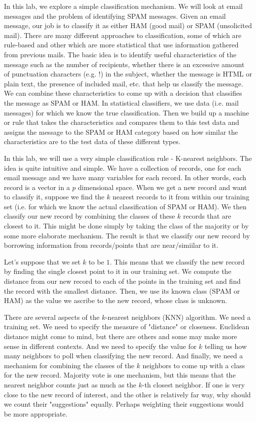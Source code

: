 
In this lab, we explore a simple classification mechanism.  We will
look at email messages and the problem of identifying SPAM messages.
Given an email message, our job is to classify it as either HAM (good
mail) or SPAM (unsolicited mail).  There are many different approaches
to classification, some of which are rule-based and other which are
more statistical that use information gathered from previous mails.
The basic idea is to identify useful characteristics of the message
such as the number of recipients, whether there is an excessive amount
of punctuation characters (e.g. !) in the subject, whether the message
is HTML or plain text, the presence of included mail, etc. that help
us classify the message.  We can combine these characteristics to come
up with a decision that classifies the message as SPAM or HAM.  In
statistical classifiers, we use data (i.e. mail messages) for which we
know the true classification.  Then we build up a machine or rule that
takes the characteristics and compares them to this test data and
assigns the message to the SPAM or HAM category based on how similar
the characteristics are to the test data of these different types. 

In this lab, we will use a very simple classification rule - K-nearest
neighbors.  The idea is quite intuitive and simple.
We have a collection of records, one for each email message
and we have many variables for each record.
In other words, each record is a vector in a $p$ dimensional 
space. When we get a new record and want to classify it,
suppose we find the $k$ nearest records to it from within our training
set (i.e. for which we know the actual classification of SPAM or HAM).
We then classify our new record by combining the classes
of these $k$ records that are closest to it.  This might be done
simply by taking the class of the majority or by some more elaborate
mechanism.  The result is that we classify our new record
by borrowing information from records/points that are near/simiilar 
to it.

Let's suppose that we set $k$ to be $1$. This means that we classify
the new record by finding the single closest point to it in our
training set.  We compute the distance from our new record to each of
the points in the training set and find the record with the smallest
distance.  Then, we use its known class (SPAM or HAM) as the value we
ascribe to the new record, whose class is unknown.

There are several aspects of the $k$-nearest neighbors (KNN)
algorithm.  We need a training set.  We need to specify the measure of
"distance" or closeness.  Euclidean distance might come to mind, but
there are others and some may make more sense in different contexts.
And we need to specify the value for $k$ telling us how many neighbors
to poll when classifying the new record.  And finally, we need a
mechanism for combining the classes of the $k$ neighbors to come up
with a class for the new record.  Majority vote is one mechanism, but
this means that the nearest neighbor counts just as much as the $k$-th
closest neighbor.  If one is very close to the new record of interest,
and the other is relatively far way, why should we count their
"suggestions" equally.  Perhaps weighting their suggestions would be
more appropriate.

